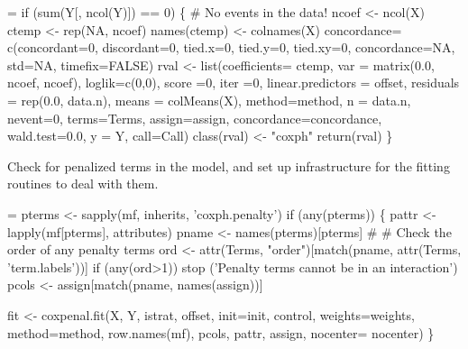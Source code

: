 \documentclass{article}
\begin{document}
\begin{nwchunk}
=
 if (sum(Y[, ncol(Y)]) == 0) \{
     # No events in the data!
     ncoef <- ncol(X)
     ctemp <- rep(NA, ncoef)
     names(ctemp) <- colnames(X)
     concordance= c(concordant=0, discordant=0, tied.x=0, tied.y=0, tied.xy=0,
                    concordance=NA, std=NA, timefix=FALSE)
     rval <- list(coefficients= ctemp,
                  var = matrix(0.0, ncoef, ncoef),
                  loglik=c(0,0),
                  score =0,
                  iter =0,
                  linear.predictors = offset,
                  residuals = rep(0.0, data.n),
                  means = colMeans(X), method=method,
                  n = data.n, nevent=0, terms=Terms, assign=assign,
                  concordance=concordance,  wald.test=0.0,
                  y = Y, call=Call)
     class(rval) <- "coxph"
     return(rval)
 \}
\end{nwchunk}

Check for penalized terms in the model, and set up infrastructure for
the fitting routines to deal with them.
\begin{nwchunk}
=
 pterms <- sapply(mf, inherits, 'coxph.penalty')
 if (any(pterms)) \{
     pattr <- lapply(mf[pterms], attributes)
     pname <- names(pterms)[pterms]
     # 
     # Check the order of any penalty terms
     ord <- attr(Terms, "order")[match(pname, attr(Terms, 'term.labels'))]
     if (any(ord>1)) stop ('Penalty terms cannot be in an interaction')
     pcols <- assign[match(pname, names(assign))] 
     
     fit <- coxpenal.fit(X, Y, istrat, offset, init=init,
                         control,
                         weights=weights, method=method,
                         row.names(mf), pcols, pattr, assign, 
                         nocenter= nocenter)
 \}
\end{nwchunk}

\end{document}
